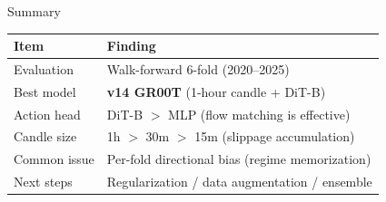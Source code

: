 \documentclass[aspectratio=169,11pt]{beamer}
\begin{document}
\begin{frame}{Summary}
  \begin{table}
    \centering
    \renewcommand{\arraystretch}{1.45}
    \begin{tabular}{ll}
      \toprule
      \textbf{Item} & \textbf{Finding} \\
      \midrule
      Evaluation & Walk-forward 6-fold (2020--2025) \\
      Best model & \textbf{v14 GR00T} (1-hour candle + DiT-B) \\
      Action head & DiT-B $>$ MLP (flow matching is effective) \\
      Candle size & 1h $>$ 30m $>$ 15m (slippage accumulation) \\
      Common issue & Per-fold directional bias (regime memorization) \\
      Next steps & Regularization / data augmentation / ensemble \\
      \bottomrule
    \end{tabular}
  \end{table}
\end{frame}
\end{document}
